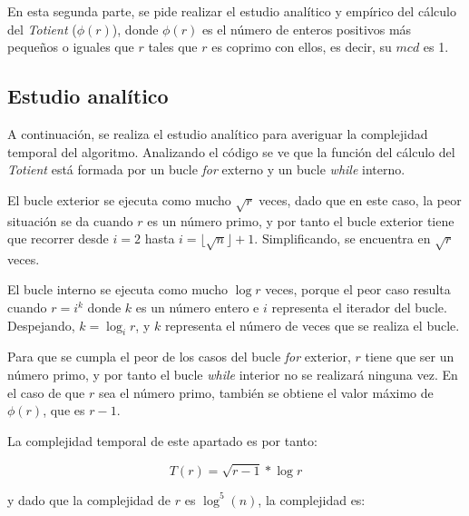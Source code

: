 \documentclass{uc3mpracticas}
\begin{document}
  En esta segunda parte, se pide realizar el estudio analítico y empírico del cálculo del \textit{Totient} ($\phi(r)$), donde $\phi(r)$ es el número de enteros positivos más pequeños o iguales que $r$ tales que $r$ es coprimo con ellos, es decir, su $mcd$ es 1.



  \subsection{Estudio analítico}

  A continuación, se realiza el estudio analítico para averiguar la complejidad temporal del algoritmo. Analizando el código se ve que la función del cálculo del \textit{Totient} está formada por un bucle \textit{for} externo y un bucle \textit{while} interno.

  \vspace{2mm}

  El bucle exterior se ejecuta como mucho $\sqrt{r}$ veces, dado que en este caso, la peor situación se da cuando $r$ es un número primo, y por tanto el bucle exterior tiene que recorrer desde $i = 2$ hasta $i = \lfloor \sqrt{n} \rfloor + 1$. Simplificando, se encuentra en $\sqrt{r}$ veces.

  \vspace{2mm}

  El bucle interno se ejecuta como mucho $\log{r}$ veces, porque el peor caso resulta cuando $ r = i^k $ donde $ k $ es un número entero e $ i $ representa el iterador del bucle. Despejando, $k = \log_ir$, y $k$ representa el número de veces que se realiza el bucle.

  \vspace{2mm}

  Para que se cumpla el peor de los casos del bucle \textit{for} exterior, $r$ tiene que ser un número primo, y por tanto el bucle \textit{while} interior no se realizará ninguna vez. En el caso de que $r$ sea el número primo, también se obtiene el valor máximo de $\phi(r)$, que es $r-1$.

  \vspace{2mm}

  La complejidad temporal de este apartado es por tanto:

  $$ T(r) = \sqrt{r-1} * \log r $$

  \vspace{5mm}

  y dado que la complejidad de $r$ es $\log^5(n)$, la complejidad es:
\end{document}
